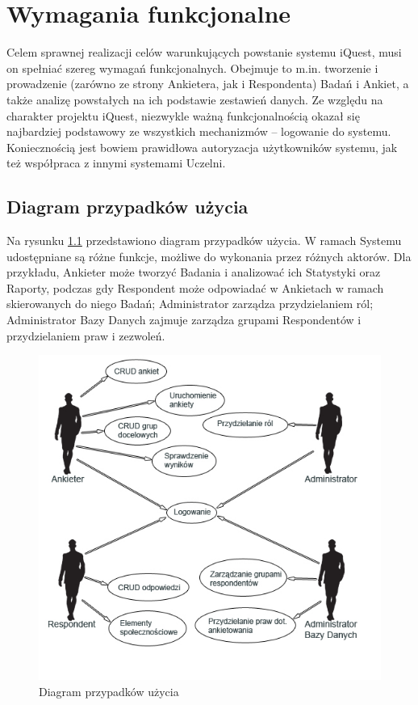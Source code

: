 \chapter{Wymagania funkcjonalne}
\label{Chapter3}

Celem sprawnej realizacji celów warunkujących powstanie systemu iQuest, musi on spełniać szereg wymagań funkcjonalnych. Obejmuje to m.in. tworzenie i prowadzenie (zarówno ze strony Ankietera, jak i Respondenta) Badań i Ankiet, a także analizę powstałych na ich podstawie zestawień danych. Ze względu na charakter projektu iQuest, niezwykle ważną funkcjonalnością okazał się najbardziej podstawowy ze wszystkich mechanizmów -- logowanie do systemu. Koniecznością jest bowiem prawidłowa autoryzacja użytkowników systemu, jak też współpraca z innymi systemami Uczelni.

\section{Diagram przypadków użycia}
\label{Chapter31}

Na rysunku \ref{rys:usecase} przedstawiono diagram przypadków użycia. W ramach Systemu udostępniane są różne funkcje, możliwe do wykonania przez różnych aktorów. Dla przykładu, Ankieter może tworzyć Badania i analizować ich Statystyki oraz Raporty, podczas gdy Respondent może odpowiadać w Ankietach w ramach skierowanych do niego Badań; Administrator zarządza przydzielaniem ról; Administrator Bazy Danych zajmuje zarządza grupami Respondentów i przydzielaniem praw i zezwoleń.

\begin{figure}[H]
\centering\includegraphics[width=15cm]{figures/UseCaseView}
\caption{Diagram przypadków użycia}\label{rys:usecase}
\end{figure}

